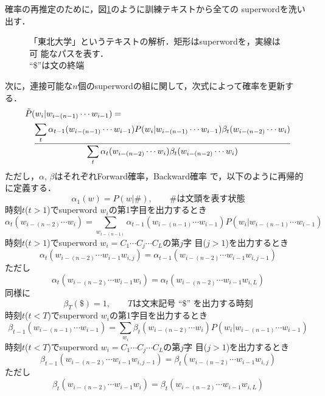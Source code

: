 確率の再推定のために，図\ref{fig4-2}のように訓練テキストから全ての
superwordを洗い出す．
\begin{figure}[t]
\vspace{-7mm}
\begin{center}
\caption{「東北大学」というテキストの解析．矩形はsuperwordを，実線は可
能なパスを表す．\\``\$''は文の終端}
\label{fig4-2}
\end{center}
\end{figure}
次に，連接可能な$n$個のsuperwordの組に関して，次式によって確率を更新す
る．
\begin{eqnarray}
\lefteqn{\tilde{P}(w_i|w_{i-(n-1)}\cdots w_{i-1})=} \nonumber \\
& &\frac{\displaystyle\sum_t\alpha_{t-1}(w_{i-(n-1)}\cdots w_{i-1})
P(w_i|w_{i-(n-1)}\cdots w_{i-1})\beta_t(w_{i-(n-2)}\cdots w_i)}
{\displaystyle\sum_t\alpha_t(w_{i-(n-2)}\cdots w_i)\beta_t(w_{i-(n-2)}\cdots w_i)}
\end{eqnarray}
ただし，$\alpha$, $\beta$はそれぞれForward確率，Backward確率
で，以下のように再帰的に定義する．
\begin{equation}
\alpha_1(w)=P(w|\#), \qquad \mbox{\#は文頭を表す状態}
\end{equation}
時刻$t$(\(t>1\))でsuperword \(w_i\)の第1字目を出力するとき
\begin{equation}
\alpha_t(w_{i-(n-2)}\cdots w_i)=\sum_{w_{i-(n-1)}}
\alpha_{t-1}(w_{i-(n-1)}\cdots w_{i-1})P(w_i|w_{i-(n-1)}\cdots
w_{i-1})
\end{equation}
時刻$t$(\(t>1\))でsuperword \(w_i=C_1\cdots C_j\cdots C_L\)の第$j$字
目(\(j>1\))を出力するとき
\begin{equation}
\alpha_t(w_{i-(n-2)}\cdots w_{i-1}w_{i,j})
=\alpha_{t-1}(w_{i-(n-2)}\cdots w_{i-1}w_{i,j-1})
\end{equation}
ただし
\begin{equation}
\alpha_t(w_{i-(n-2)}\cdots w_{i-1}w_i)
=\alpha_t(w_{i-(n-2)}\cdots w_{i-1}w_{i,L})
\end{equation}
同様に
\begin{equation}
\beta_T(\$)=1, \qquad \mbox{$T$は文末記号 ``\$'' を出力する時刻}
\end{equation}
時刻$t$(\(t<T\))でsuperword \(w_i\)の第1字目を出力するとき
\begin{equation}
\beta_{t-1}(w_{i-(n-1)}\cdots w_{i-1})
=\sum_{w_i}\beta_t(w_{i-(n-2)}\cdots w_i)
P(w_i|w_{i-(n-1)}\cdots w_{i-1})
\end{equation}
時刻$t$(\(t<T\))でsuperword \(w_i=C_1\cdots C_j\cdots C_L\)の第$j$字
目(\(j>1\))を出力するとき
\begin{equation}
\beta_{t-1}(w_{i-(n-2)}\cdots w_{i-1}w_{i,j-1})
=\beta_t(w_{i-(n-2)}\cdots w_{i-1}w_{i,j})
\end{equation}
ただし
\begin{equation}
\beta_t(w_{i-(n-2)}\cdots w_{i-1}w_i)
=\beta_t(w_{i-(n-2)}\cdots w_{i-1}w_{i,L})
\end{equation}
